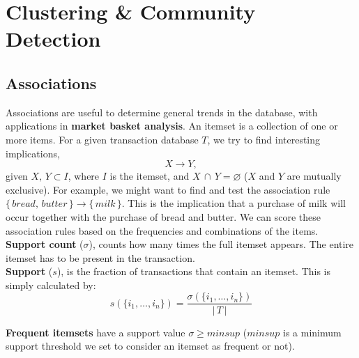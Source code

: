 \documentclass[9pt,twocolumn]{article}
\begin{document}
\section{Clustering \& Community Detection}
\subsection*{Associations}
Associations are useful to determine general trends in the database, with applications in \textbf{market basket analysis}. An itemset is a collection of one or more items. For a given transaction database $T$, we try to find interesting implications,
\begin{equation}
	X\rightarrow Y,
\end{equation}
given $X,\,Y \subset I$, where $I$ is the itemset, and $X\,\cap\,Y = \varnothing$ ($X$ and $Y$ are mutually exclusive). For example, we might want to find and test the association rule $\{\,bread,\,butter\,\} \rightarrow \{\,milk\,\}$. This is the implication that a purchase of milk will occur together with the purchase of bread and butter. We can score these association rules based on the frequencies and combinations of the items.\\

\textbf{Support count} ($\sigma$), counts how many times the full itemset appears. The entire itemset has to be present in the transaction.\\

\textbf{Support} ($s$), is the fraction of transactions that contain an itemset. This is simply calculated by:
\begin{equation}
	s(\{i_1, \ldots, i_n\}) = \frac{\sigma(\{i_1, \ldots, i_n\})}{|\,T\,|}
\end{equation}

\textbf{Frequent itemsets} have a support value $\sigma \geq minsup$ ($minsup$ is a minimum support threshold we set to consider an itemset as frequent or not).
\end{document}
